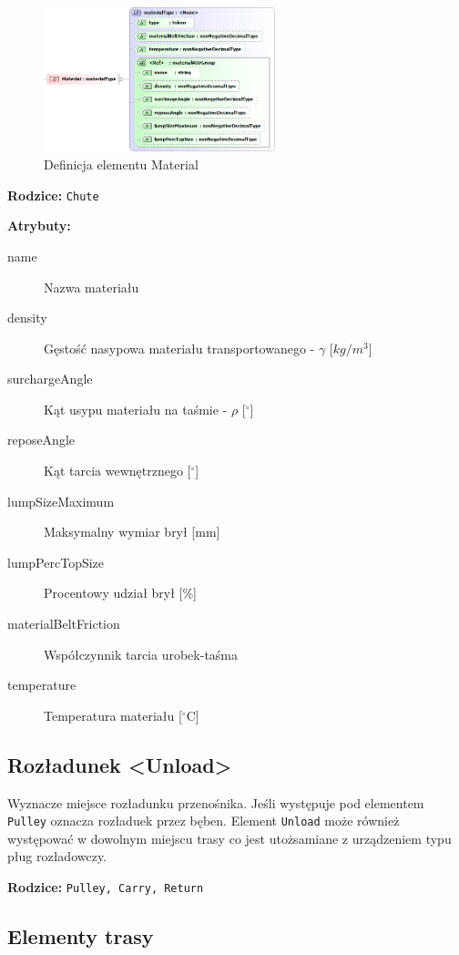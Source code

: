 \documentclass[12pt,a4paper]{article}
\begin{document}
\begin{figure}[H]
  \centering
  \includegraphics[width=0.6\textwidth]{png/liquid/Material}
  \caption{Definicja elementu Material}
  \label{fig:material-xsd}
\end{figure}

\noindent\textbf{Rodzice:} \texttt{Chute}

\noindent\textbf{Atrybuty:}
\begin{description}
\item[name] Nazwa materiału
\item[density] Gęstość nasypowa materiału transportowanego - $\gamma$ [$kg/m^3$]
\item[surchargeAngle] Kąt usypu materiału na taśmie - $\rho$ [$^\circ$]
\item[reposeAngle] Kąt tarcia wewnętrznego [$^\circ$]
\item[lumpSizeMaximum] Maksymalny wymiar brył [mm]
\item[lumpPercTopSize] Procentowy udział brył [\%]
\item[materialBeltFriction] Współczynnik tarcia urobek-taśma
\item[temperature] Temperatura materiału [$^\circ$C]
\end{description}


\subsection{Rozładunek <Unload>}
Wyznacze miejsce rozładunku przenośnika. Jeśli występuje pod elementem {\tt Pulley}
oznacza rozładuek przez bęben.  Element {\tt Unload} może również występować w
dowolnym miejscu trasy co jest utożsamiane z urządzeniem typu pług rozładowczy.

\noindent\textbf{Rodzice:} \texttt{Pulley, Carry, Return}


\subsection{Elementy trasy}
\end{document}
